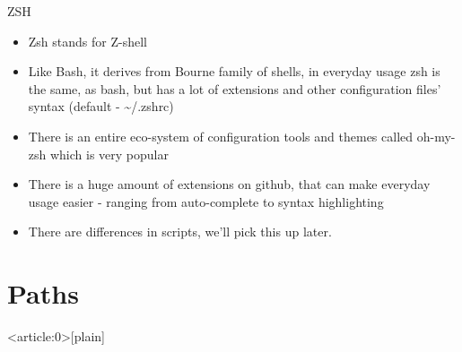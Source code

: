 \documentclass[usenames,dvipsnames,10pt,aspectratio=169]{beamer}
\begin{document}
\begin{frame}{ZSH}
    \begin{itemize}
        \item Zsh stands for {\color{ucugreen}Z-shell}
        \item Like Bash, it derives from Bourne family of shells, in everyday usage zsh is the same, as {\color{ucugreen} bash}, but has a lot of extensions and other configuration files' syntax (default - {\color{ucugreen} \textasciitilde/.zshrc})
        \item There is an entire eco-system of configuration tools and themes called oh-my-zsh which is very popular
        \item There is a huge amount of extensions on github, that can make everyday usage easier - ranging from auto-complete to syntax highlighting
        \item There are differences in scripts, we'll pick this up later.
        
    \end{itemize}
\end{frame}

\section{Paths}

{ %
    \begin{frame}<article:0>[plain]
     \end{frame}
}
\end{document}
